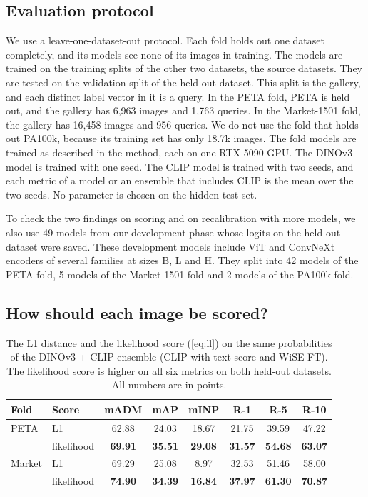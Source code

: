 \documentclass[10pt,twocolumn,letterpaper]{article}
\begin{document}
\subsection{Evaluation protocol}
\label{sec:protocol}
We use a leave-one-dataset-out protocol. Each fold holds out one dataset completely, and its models see none of its images in training. The models are trained on the training splits of the other two datasets, the source datasets. They are tested on the validation split of the held-out dataset. This split is the gallery, and each distinct label vector in it is a query. In the PETA fold, PETA is held out, and the gallery has 6,963 images and 1,763 queries. In the Market-1501 fold, the gallery has 16,458 images and 956 queries. We do not use the fold that holds out PA100k, because its training set has only 18.7k images. The fold models are trained as described in the method, each on one RTX 5090 GPU. The DINOv3 model is trained with one seed. The CLIP model is trained with two seeds, and each metric of a model or an ensemble that includes CLIP is the mean over the two seeds. No parameter is chosen on the hidden test set.

To check the two findings on scoring and on recalibration with more models, we also use 49 models from our development phase whose logits on the held-out dataset were saved. These development models include ViT and ConvNeXt encoders of several families at sizes B, L and H. They split into 42 models of the PETA fold, 5 models of the Market-1501 fold and 2 models of the PA100k fold.

\subsection{How should each image be scored?}
\label{sec:score}

\begin{table}[t]
\centering
\small
\setlength{\tabcolsep}{3.2pt}
\begin{tabular}{@{}llcccccc@{}}
\toprule
Fold & Score & mADM & mAP & mINP & R-1 & R-5 & R-10 \\
\midrule
PETA & L1 & 62.88 & 24.03 & 18.67 & 21.75 & 39.59 & 47.22 \\
 & likelihood & \textbf{69.91} & \textbf{35.51} & \textbf{29.08} & \textbf{31.57} & \textbf{54.68} & \textbf{63.07} \\
\midrule
Market & L1 & 69.29 & 25.08 & 8.97 & 32.53 & 51.46 & 58.00 \\
 & likelihood & \textbf{74.90} & \textbf{34.39} & \textbf{16.84} & \textbf{37.97} & \textbf{61.30} & \textbf{70.87} \\
\bottomrule
\end{tabular}
\caption{The L1 distance and the likelihood score (\cref{eq:ll}) on the same probabilities of the DINOv3 + CLIP ensemble (CLIP with text score and WiSE-FT). The likelihood score is higher on all six metrics on both held-out datasets. All numbers are in points.}
\label{tab:score}
\end{table}
\end{document}
